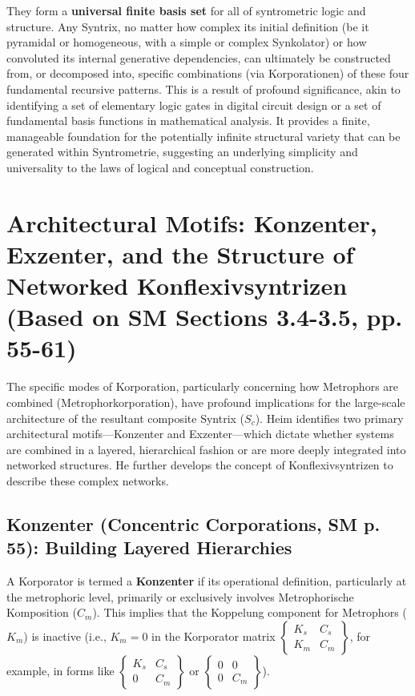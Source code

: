 \documentclass[
    12pt,              %
    a4paper,           %
    headings=normal,   %
    twoside=true,      %
    BCOR=8mm,          %
]{scrbook}
\newcommand{\korporatoroperator}{\begin{Bmatrix} K_s & C_s \\ K_m & C_m \end{Bmatrix}}
\begin{document}
They form a \textbf{universal finite basis set} for all of syntrometric logic and structure. Any Syntrix, no matter how complex its initial definition (be it pyramidal or homogeneous, with a simple or complex Synkolator) or how convoluted its internal generative dependencies, can ultimately be constructed from, or decomposed into, specific combinations (via Korporationen) of these four fundamental recursive patterns. This is a result of profound significance, akin to identifying a set of elementary logic gates in digital circuit design or a set of fundamental basis functions in mathematical analysis. It provides a finite, manageable foundation for the potentially infinite structural variety that can be generated within Syntrometrie, suggesting an underlying simplicity and universality to the laws of logical and conceptual construction.

\section{Architectural Motifs: Konzenter, Exzenter, and the Structure of Networked Konflexivsyntrizen (Based on SM Sections 3.4-3.5, pp. 55-61)}
\label{sec:ch3_architectural_motifs_main} %

The specific modes of Korporation, particularly concerning how Metrophors are combined (Metrophorkorporation), have profound implications for the large-scale architecture of the resultant composite Syntrix (\(S_c\)). Heim identifies two primary architectural motifs—Konzenter and Exzenter—which dictate whether systems are combined in a layered, hierarchical fashion or are more deeply integrated into networked structures. He further develops the concept of Konflexivsyntrizen to describe these complex networks.

\subsection{Konzenter (Concentric Corporations, SM p. 55): Building Layered Hierarchies}
\label{sec:ch3_konzenter_original} 

A Korporator is termed a \textbf{Konzenter} if its operational definition, particularly at the metrophoric level, primarily or exclusively involves Metrophorische Komposition (\(C_m\)). This implies that the Koppelung component for Metrophors (\(K_m\)) is inactive (i.e., \(K_m = 0\) in the Korporator matrix \(\korporatoroperator\), for example, in forms like \( \begin{Bmatrix} K_s & C_s \\ 0 & C_m \end{Bmatrix} \) or \( \begin{Bmatrix} 0 & 0 \\ 0 & C_m \end{Bmatrix} \)).
\end{document}
